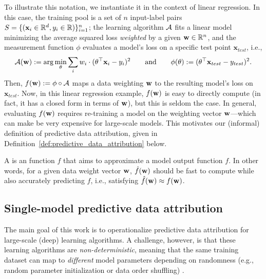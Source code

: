 To illustrate this notation, we instantiate it in the context of linear
regression. In this case, the training pool is a set of $n$ input-label pairs
$S = \{(\mathbf{x}_i \in \mathbb{R}^d, y_i \in \mathbb{R}) \}_{i=1}^n$;
the learning algorithm $\mathcal{A}{}$ fits a linear model minimizing the average
squared loss {\em weighted} by a given $\mathbf{w} \in \mathbb{R}^n$, and the
measurement function $\phi$ evaluates a model's loss on a specific test point
$\mathbf{x}_{test}$, i.e.,
$$\mathcal{A}{}(\mathbf{w}) := \arg\min_\theta \sum_i w_i \cdot (\theta^\top \mathbf{x}_i -
y_i)^2 \qquad \text{and} \qquad \phi(\theta) := (\theta^\top \mathbf{x}_{test} -
y_{test})^2.$$ Then, $f(\mathbf{w}) := \phi \circ \mathcal{A}{}$ maps a data
weighting $\mathbf{w}$
to the resulting model's loss on $\mathbf{x}_{test}$.
Now, in this linear regression example, $f(\mathbf{w})$ is easy to directly compute
(in fact, it has a closed form in terms of $\mathbf{w}$),
but this is seldom the case.
In general, evaluating $f(\mathbf{w})$ requires re-training a model on the weighting
vector $\mathbf{w}$---which can make be very expensive for large-scale models.
This motivates our (informal) definition of predictive data attribution,
given in Definition~\ref{def:predictive_data_attribution} below.

\begin{boxdef}
  \label{def:predictive_data_attribution}
  \vspace*{-0.5em}
  A \underline{} is an
  \underline{} function
  $\hat{f}$ that aims to approximate a model output function $f$.
  In other words, for a given data weight vector
  $\mathbf{w}$, $\hat{f}(\mathbf{w})$ should be fast to compute
  while also accurately predicting $f$, i.e., satisfying
  $\hat{f}(\mathbf{w}) \approx f(\mathbf{w})$.
  \vspace*{0.4em}
\end{boxdef}

\subsection{Single-model predictive data attribution}
\label{sec:single_model_data_attribution}
The main goal of this work is to operationalize predictive data attribution
for large-scale (deep) learning algorithms.
A challenge, however, is that these learning algorithms are {\em
non-deterministic},
meaning that the same training dataset can map to \textit{different} model
parameters depending on randomness (e.g., random parameter
initialization or data order shuffling) \citep{zhuang2022randomness,jordan2024variance}.

